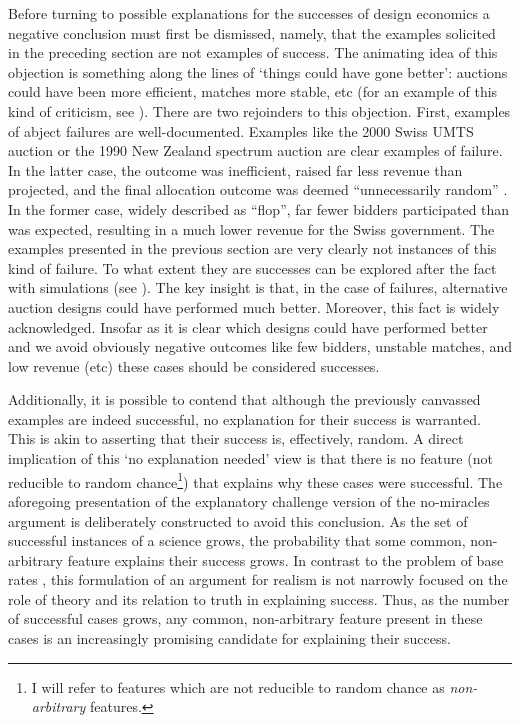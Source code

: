 Before turning to possible explanations for the successes of design economics a negative conclusion must first be dismissed, namely, that the examples solicited in the preceding section are not examples of success. The animating idea of this objection is something along the lines of `things could have gone better': auctions could have been more efficient, matches more stable, etc (for an example of this kind of criticism, see \cite{ledyard1997}). There are two rejoinders to this objection. First, examples of abject failures are well-documented. Examples like the 2000 Swiss UMTS auction \autocite{wolfstetter2001} or the 1990 New Zealand spectrum auction \autocite[\S1.2.2]{milgrom2004} are clear examples of failure. In the latter case, the outcome was inefficient, raised far less revenue than projected, and the final allocation outcome was deemed ``unnecessarily random'' \autocite[12]{milgrom2004}. In the former case, widely described as ``flop'', far fewer bidders participated than was expected, resulting in a much lower revenue for the Swiss government. The examples presented in the previous section are very clearly not instances of this kind of failure. To what extent they are successes can be explored after the fact with simulations (see \cite{newman2024}). The key insight is that, in the case of failures, alternative auction designs could have performed much better. Moreover, this fact is widely acknowledged. Insofar as it is clear which designs could have performed better and we avoid obviously negative outcomes like few bidders, unstable matches, and low revenue (etc) these cases should be considered successes. 

Additionally, it is possible to contend that although the previously canvassed examples are indeed successful, no explanation for their success is warranted. This is akin to asserting that their success is, effectively, random. A direct implication of this `no explanation needed' view is that there is no feature (not reducible to random chance\footnote{I will refer to features which are not reducible to random chance as \textit{non-arbitrary} features.}) that explains why these cases were successful. The aforegoing presentation of the explanatory challenge version of the no-miracles argument is deliberately constructed to avoid this conclusion. As the set of successful instances of a science grows, the probability that some common, non-arbitrary feature explains their success grows. In contrast to the problem of base rates \autocite{callender2004}, this formulation of an argument for realism is not narrowly focused on the role of theory and its relation to truth in explaining success. Thus, as the number of successful cases grows, any common, non-arbitrary feature present in these cases is an increasingly promising candidate for explaining their success.

